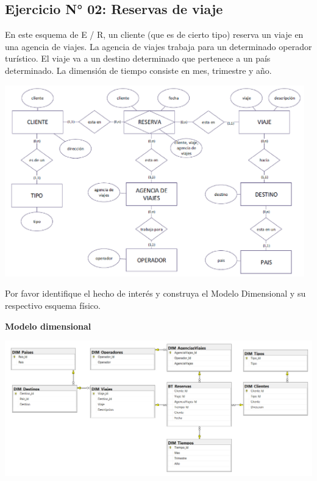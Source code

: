 \documentclass[12pt,letterpaper]{article}
\begin{document}
\subsection{Ejercicio N° 02: Reservas de viaje}
En este esquema de E / R, un cliente (que es de cierto tipo) reserva un viaje en una agencia de viajes. La agencia de viajes trabaja para un determinado operador turístico. El viaje va a un destino determinado que pertenece a un país determinado. La dimensión de tiempo consiste en mes, trimestre y año.

\begin{center}
    \includegraphics[width=13cm]{./img/img2.png}
\end{center}

Por favor identifique el hecho de interés y construya el Modelo Dimensional y su respectivo esquema físico.

\textbf{Modelo dimensional}
\begin{center}
    \includegraphics[width=16cm]{./img/img6.png}
\end{center}
\end{document}
